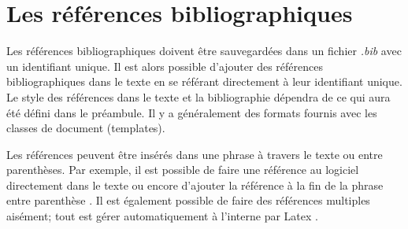 \documentclass[../exemple_master.tex]{subfiles}
\begin{document}
\section{Les références bibliographiques}

Les références bibliographiques doivent être sauvegardées dans un fichier \emph{.bib} avec un identifiant unique. Il est alors possible d'ajouter des références bibliographiques dans le texte en se référant directement à leur identifiant unique. Le style des références dans le texte et la bibliographie dépendra de ce qui aura été défini dans le préambule. Il y a généralement des formats fournis avec les classes de document (templates).

Les références peuvent être insérés dans une phrase à travers le texte ou entre parenthèses. Par exemple, il est possible de faire une référence au logiciel \cite{WHAT2016} directement dans le texte ou encore d'ajouter la référence à la fin de la phrase entre parenthèse \citep{WHAT2016}. Il est également possible de faire des références multiples aisément; tout est gérer automatiquement à l'interne par Latex \citep{WHAT2016,ladeveze2016}.
\end{document}
